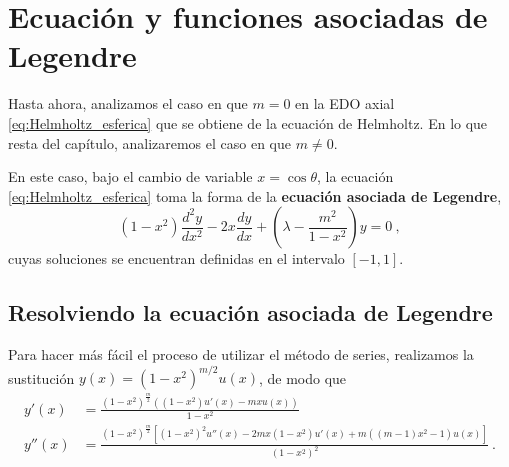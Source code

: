 \section{Ecuación y funciones asociadas de Legendre}

Hasta ahora, analizamos el caso en que $m=0$ en la EDO axial \eqref{eq:Helmholtz_esferica} que se obtiene de la ecuación de Helmholtz. En lo que resta del capítulo, analizaremos el caso en que $m \neq 0$.

En este caso, bajo el cambio de variable $x=\cos\theta$, la ecuación \eqref{eq:Helmholtz_esferica} toma la forma de la 
%
\textbf{ecuación asociada de Legendre},
\begin{equation}\label{eq:EDO_asociada_Legendre}
    (1-x^2) \frac{d^2y}{dx^2} - 2x\frac{dy}{dx} + \left( \lambda - \frac{m^2}{1-x^2} \right) y = 0 \ ,
\end{equation}
cuyas soluciones se encuentran definidas en el intervalo $[-1,1]$.

\subsection{Resolviendo la ecuación asociada de Legendre}

Para hacer más fácil el proceso de utilizar el método de series, realizamos la sustitución $y(x) = (1-x^2)^{m/2} u(x)$, de modo que
\begin{align*}
    y'(x) & = \frac{\left(1 - x^{2}\right)^{\frac{m}{2}} \left((1 - x^2) u'\left(x\right) - mx u\left(x\right)\right)}{1 - x^2} \\
    y''(x) & = \frac{\left(1 - x^{2}\right)^{\frac{m}{2}} \left[(1-x^2)^2 u'' \left(x\right) - 2mx (1 - x^2) u'(x) + m\left((m - 1) x^{2} - 1\right) u\left(x\right)\right]}{(1- x^2)^2} \ .
\end{align*}

